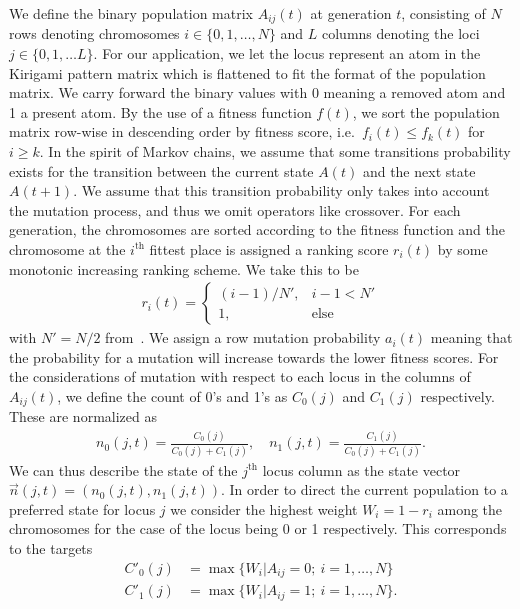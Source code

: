 We define the binary population matrix $A_{ij}(t)$ at generation $t$, consisting of
$N$ rows denoting chromosomes $i \in \{0, 1, \ldots, N\}$ and $L$ columns denoting the loci $j \in \{0, 1, \ldots L\}$. For our application, we let the locus represent an atom in the Kirigami pattern matrix which is flattened to fit the format of the population matrix. We carry forward the binary values with 0 meaning a removed atom and 1 a present atom. By the use of a fitness function $f(t)$, we sort the population matrix row-wise in descending order by fitness score, i.e.\ $f_i(t) \le f_k(t)$ for $i \ge k$. In the spirit of Markov chains, we assume that some transitions probability exists for the transition between the current state
$A(t)$ and the next state $A(t+1)$. We assume that this transition probability
only takes into account the mutation process, and thus we omit operators like
crossover. For each generation, the chromosomes are sorted according to the
fitness function and the chromosome at the $i^{\text{th}}$ fittest place is assigned a ranking score $r_i(t)$ by some monotonic increasing ranking scheme. We take this to be
\begin{align*}
  r_i(t) = 
  \begin{cases}
    (i-1)/N',& i-1 < N' \\
    1, &\text{else}
  \end{cases}
\end{align*}
with $N' = N/2$ from~\cite{Wang2010}. We assign a row mutation probability $a_i(t)$ meaning that the probability for a mutation will increase towards the lower fitness scores. For the considerations of mutation with respect to each locus in the columns of $A_{ij}(t)$, we define the count of 0's and 1's as $C_0(j)$ and $C_1(j)$ respectively. These are normalized as
\begin{align*}
  n_0(j, t) = \frac{C_0(j)}{C_0(j) + C_1(j)}, \quad n_1(j, t) = \frac{C_1(j)}{C_0(j) + C_1(j)}.
\end{align*}
We can thus describe the state of the $j^{\text{th}}$ locus column as the state vector $\vec{n}(j,t)=(n_0(j, t), n_1(j, t))$. In order to direct the current population to a preferred state for locus $j$ we consider the highest weight $W_i = 1 - r_i$ among the chromosomes for the case of the locus being 0 or 1 respectively. This corresponds to the targets
\begin{align*}
  C'_0(j) &= \max\{W_i | A_{ij} = 0; \ i = 1, \ldots, N\} \\
  C'_1(j) &= \max\{W_i | A_{ij} = 1; \ i = 1, \ldots, N\}.
\end{align*}
